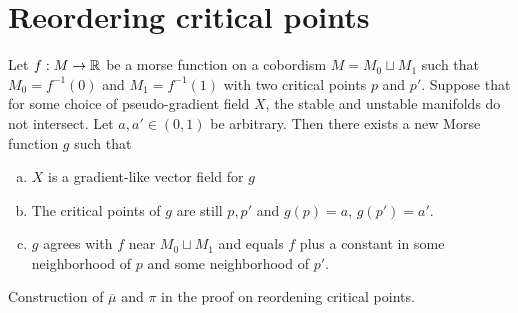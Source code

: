 

\filbreak
\section{Reordering critical points}
\begin{theorem}
    Let $f: M \to  \mathbb{R}$ be a morse function on a cobordism $M = M_0 \sqcup M_1$ such that $ M_0 = f^{-1}(0)$ and $ M_1 = f^{-1}(1)$ with two critical points $p$ and  $p'$.
    Suppose that for some choice of pseudo-gradient field $X$, the stable and unstable manifolds do not intersect.
    Let $a, a' \in (0,1)$ be arbitrary.
    Then there exists a new Morse function $g$ such that
    \begin{enumerate}[(a)]
        \item $X$ is a gradient-like vector field for  $g$
        \item The critical points of  $g$ are still $p, p'$ and $g(p) = a$,  $g(p') = a'$.
        \item $g$ agrees with  $f$ near $M_0 \sqcup M_1$ and equals $f$ plus a constant in some neighborhood of  $p$ and some neighborhood of  $p'$.
    \end{enumerate}
\end{theorem}
\begin{marginfigure}
    \centering
    \caption{
        Construction of $\overline{\mu}$ and $\pi$ in the proof on reordening critical points.
    }
    \label{fig:reordening-theorem-milnor-h-cobordism}
\end{marginfigure}
